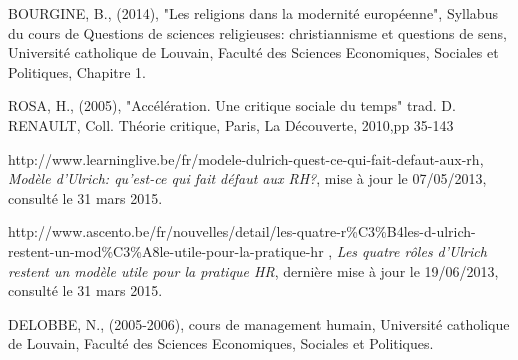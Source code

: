 \documentclass[a4paper, 12pt]{article}
\begin{document}
\noindent BOURGINE, B., (2014), "Les religions dans la modernité européenne", Syllabus du cours de Questions de sciences religieuses: christiannisme et questions de sens, Université catholique de Louvain, Faculté des Sciences Economiques, Sociales et Politiques, Chapitre 1.

\vspace{0.5cm}

\noindent ROSA, H., (2005), "Accélération. Une critique sociale du temps" trad. D. RENAULT, Coll. Théorie critique, Paris, La Découverte, 2010,pp 35-143

\vspace{0.5cm}

\noindent http://www.learninglive.be/fr/modele-dulrich-quest-ce-qui-fait-defaut-aux-rh, \textit{Modèle d'Ulrich: qu'est-ce qui fait défaut aux RH?}, mise à jour le 07/05/2013, consulté le 31 mars 2015.

\vspace{0.5cm}

\noindent http://www.ascento.be/fr/nouvelles/detail/les-quatre-r\%C3\%B4les-d-ulrich-restent-un-mod\%C3\%A8le-utile-pour-la-pratique-hr , \textit{Les quatre rôles d'Ulrich restent un modèle utile pour la pratique HR},  dernière mise à jour le 19/06/2013, consulté le 31 mars 2015.

\vspace{0.5cm}

\noindent DELOBBE, N., (2005-2006), cours de management humain, Université catholique de Louvain, Faculté des Sciences Economiques, Sociales et Politiques.
\end{document}
